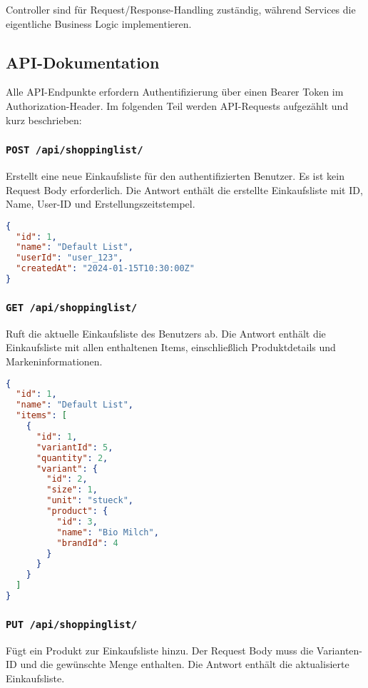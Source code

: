 Controller sind für Request/Response-Handling zuständig, während Services die eigentliche Business Logic implementieren.

\subsection{API-Dokumentation}

Alle API-Endpunkte erfordern Authentifizierung über einen Bearer Token im Authorization-Header. Im folgenden Teil werden API-Requests aufgezählt und kurz beschrieben:

\subsubsection{\texttt{POST /api/shoppinglist/}}

Erstellt eine neue Einkaufsliste für den authentifizierten Benutzer. Es ist kein Request Body erforderlich. Die Antwort enthält die erstellte Einkaufsliste mit ID, Name, User-ID und Erstellungszeitstempel.

\begin{lstlisting}[language=JSON]
{
  "id": 1,
  "name": "Default List",
  "userId": "user_123",
  "createdAt": "2024-01-15T10:30:00Z"
}
\end{lstlisting}

\subsubsection{\texttt{GET /api/shoppinglist/}}

Ruft die aktuelle Einkaufsliste des Benutzers ab. Die Antwort enthält die Einkaufsliste mit allen enthaltenen Items, einschließlich Produktdetails und Markeninformationen.

\begin{lstlisting}[language=JSON]
{
  "id": 1,
  "name": "Default List",
  "items": [
    {
      "id": 1,
      "variantId": 5,
      "quantity": 2,
      "variant": {
        "id": 2,
        "size": 1,
        "unit": "stueck",
        "product": {
          "id": 3,
          "name": "Bio Milch",
          "brandId": 4
        }
      }
    }
  ]
}
\end{lstlisting}

\subsubsection{\texttt{PUT /api/shoppinglist/}}

Fügt ein Produkt zur Einkaufsliste hinzu. Der Request Body muss die Varianten-ID und die gewünschte Menge enthalten. Die Antwort enthält die aktualisierte Einkaufsliste.

